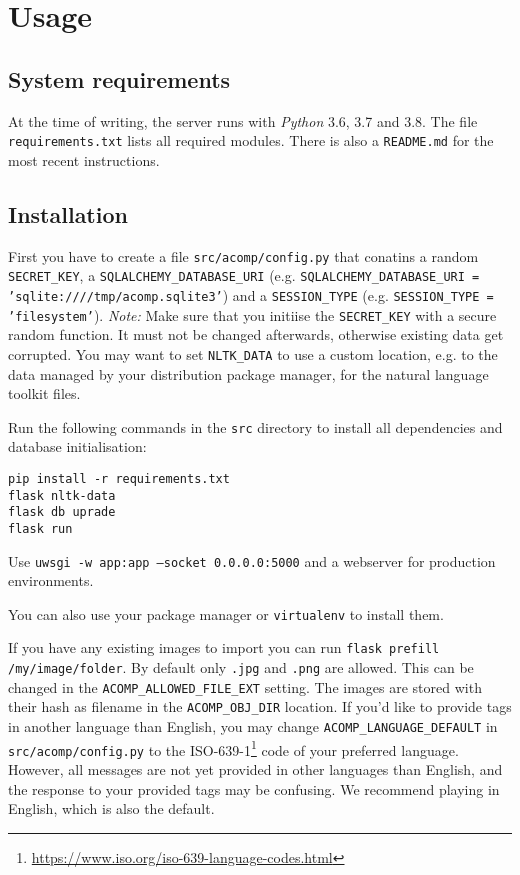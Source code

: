 \section{Usage}
\label{gacomphs19:sec:usage}

\subsection{System requirements}
\label{gacomphs19:sec:usage:requirements}
At the time of writing, the server runs with \textit{Python} 3.6, 3.7 and 3.8. The file
\texttt{requirements.txt} lists all required modules.
There is also a \texttt{README.md} for the most recent instructions.

\subsection{Installation}
\label{gacomphs19:sec:usage:instllation}
First you have to create a file \texttt{src/acomp/config.py} that conatins
a random \texttt{SECRET\_KEY}, a \texttt{SQLALCHEMY\_DATABASE\_URI}
(e.g. \texttt{SQLALCHEMY\_DATABASE\_URI = 'sqlite:////tmp/acomp.sqlite3'}) and
a \texttt{SESSION\_TYPE} (e.g. \texttt{SESSION\_TYPE = 'filesystem'}).
\textit{Note:} Make sure that you initiise the \texttt{SECRET\_KEY} with a secure random function.
It must not be changed afterwards, otherwise existing data get corrupted.
You may want to set \texttt{NLTK\_DATA} to use a custom location, e.g. to the data
managed by your distribution package manager, for the natural language toolkit files.

Run the following commands in the \texttt{src} directory to install all dependencies and
database initialisation:

\begin{verbatim}
pip install -r requirements.txt
flask nltk-data
flask db uprade
flask run
\end{verbatim}

Use \texttt{uwsgi -w app:app --socket 0.0.0.0:5000} and a webserver for production environments.

You can also use your package manager or \texttt{virtualenv} to install them.

If you have any existing images to import you can run
\texttt{flask prefill /my/image/folder}. By default only \texttt{.jpg} and \texttt{.png}
are allowed. This can be changed in the \texttt{ACOMP\_ALLOWED\_FILE\_EXT} setting. The
images are stored with their hash as filename in the \texttt{ACOMP\_OBJ\_DIR} location.
If you'd like to provide tags in another language than English, you may change
\texttt{ACOMP\_LANGUAGE\_DEFAULT} in \texttt{src/acomp/config.py} to the
ISO-639-1\footnote{\url{https://www.iso.org/iso-639-language-codes.html}} code of your preferred language.
However, all messages are not yet provided in other languages than English,
and the response to your provided tags may be confusing.
We recommend playing in English, which is also the default.

